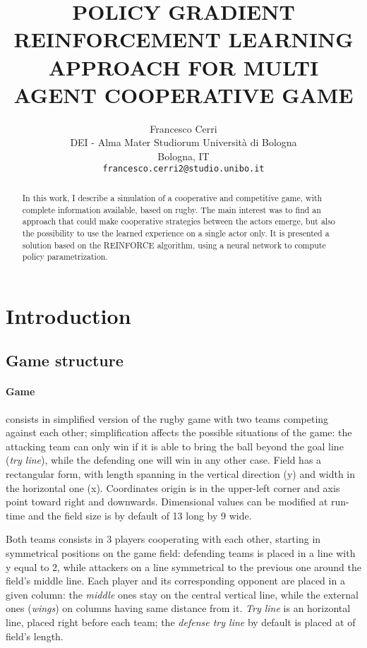 \documentclass{article}
\title{POLICY GRADIENT REINFORCEMENT LEARNING APPROACH FOR  MULTI AGENT COOPERATIVE GAME}
\author{
  Francesco Cerri\\
  DEI - Alma Mater Studiorum Università di Bologna\\
  Bologna, IT\\
  \texttt{francesco.cerri2@studio.unibo.it} \\
}
\begin{document}
\maketitle

\begin{abstract}
In this work, I describe a simulation of a cooperative and competitive game, with complete information available, based on rugby. The main interest was to find an approach that could make cooperative strategies between the actors emerge, but also the possibility to use the learned experience on a single actor only. It is presented a solution based on the REINFORCE algorithm, using a neural network to compute policy parametrization.
\end{abstract}
\section{Introduction}
\label{intro}
\subsection{Game structure}
 \paragraph{Game}consists in simplified version of the rugby game with two teams competing against each other; simplification affects the possible situations of the game: the attacking team can only win if it is able to bring the ball beyond the goal line (\emph{try line}), while the defending one will win in any other case.
 Field has a rectangular form, with length spanning in the vertical direction (y) and width in the horizontal one (x). Coordinates origin is in the upper-left corner and axis point toward right and downwards.
 Dimensional values can be modified at run-time and the field size is by default of 13 long by 9 wide.
 
 Both teams consists in 3 players cooperating with each other, starting in symmetrical positions on the game field: defending teams is placed in a line with y equal to 2, while attackers on a line symmetrical to the previous one around the field's middle line. Each player and its corresponding opponent are placed in a given column: the \emph{middle} ones stay on the central vertical line, while the external ones (\emph{wings}) on columns having same distance from it.\newline
\emph{Try line} is an horizontal line, placed right before each team; the \emph{defense try line} by default is placed at  of field's length.
\end{document}
